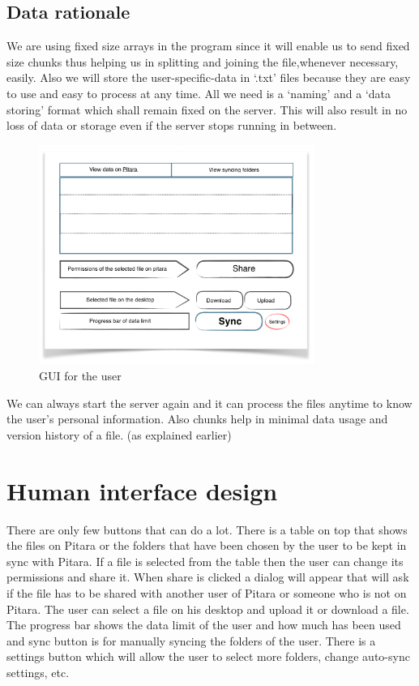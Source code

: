 \documentclass{article}
\begin{document}
	 \subsection{Data rationale}
 We are using fixed size arrays in the program since it will enable us to send fixed size chunks thus helping us in splitting and joining the file,whenever necessary, easily. Also we will store the user-specific-data in `.txt' files because they are easy to use and easy to process at any time. All we need is a `naming' and a `data storing' format which shall remain fixed on the server. This will also result in no loss of data or storage even if the server stops running in between.
   \begin{figure}
\centering
\includegraphics[width=90mm]{diagram2.png} 
\caption{GUI for the user}\label{this}
\end{figure}
 We can always start the server again and it can process the files anytime to know the user's personal information.
Also chunks help in minimal data usage and version history of a file. (as explained earlier)

	\section{Human interface design}\label{hid}
	There are only few buttons that can do a lot. There is a table on top that shows the files on Pitara or the folders that have been chosen by the user to be kept in sync with Pitara. If a file is selected from the table then the user can change its permissions and share it. When share is clicked a dialog will appear that will ask if the file has to be shared with another user of Pitara or someone who is not on Pitara. The user can select a file on his desktop and upload it or download a file. The progress bar shows the data limit of the user and how much has been used and sync button is for manually syncing the folders of the user. There is a settings button which will allow the user to select more folders, change auto-sync settings, etc.
	
\end{document}
